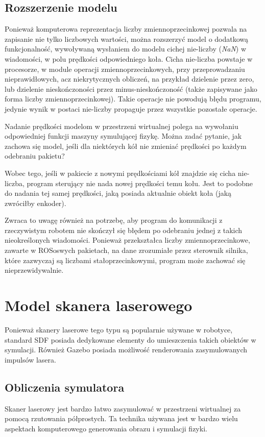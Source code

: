 	\subsection{Rozszerzenie modelu}
		\label{sec:model_nan}
		Ponieważ komputerowa reprezentacja liczby zmiennoprzecinkowej pozwala na zapisanie nie tylko liczbowych wartości, można rozszerzyć model o dodatkową funkcjonalność,
		wywoływaną wysłaniem do modelu cichej nie-liczby (\emph{NaN}) w wiadomości, w polu prędkości odpowiedniego koła. 
		Cicha nie-liczba powstaje w procesorze, w module operacji zmiennoprzecinkowych, przy przeprowadzaniu nieprawidłowych, 
		acz niekrytycznych obliczeń, na przykład dzielenie przez zero, lub dzielenie nieskończoności przez minus-nieskończoność 
		(także zapisywane jako forma liczby zmiennoprzecinkowej).
		Takie operacje nie powodują błędu programu, jedynie wynik w postaci nie-liczby propaguje przez wszystkie pozostałe operacje.

		Nadanie prędkości modelom w przestrzeni wirtualnej polega na wywołaniu odpowiedniej funkcji maszyny symulującej fizykę.
		Można zadać pytanie, jak zachowa się model, jeśli dla niektórych kół nie zmieniać prędkości po każdym odebraniu pakietu?

		Wobec tego, jeśli w pakiecie z nowymi prędkościami kół znajdzie się cicha nie-liczba, program sterujący nie nada nowej prędkości temu kołu.
		Jest to podobne do nadania tej samej prędkości, jaką posiada aktualnie obiekt koła (jaką zwróciłby enkoder).

		Zwraca to uwagę również na potrzebę, aby program do komunikacji z rzeczywistym robotem nie skończył się błędem po odebraniu jednej z takich nieokreślonych wiadomości.
		Ponieważ przekształca liczby zmiennoprzecinkowe, zawarte w ROSoswych pakietach, na dane zrozumiałe przez sterownik silnika, które zazwyczaj są liczbami
		stałoprzecinkowymi, program może zachować się nieprzewidywalnie.
		
\section{Model skanera laserowego}
	Ponieważ skanery laserowe tego typu są popularnie używane w robotyce, standard SDF posiada dedykowane elementy do umieszczenia takich obiektów w symulacji.
	Również Gazebo posiada możliwość renderowania zasymulowanych impulsów lasera.
	
	\subsection{Obliczenia symulatora}
		Skaner laserowy jest bardzo łatwo zasymulować w przestrzeni wirtualnej za pomocą rzutowania półprostych.
		Ta technika używana jest w bardzo wielu aspektach komputerowego generowania obrazu i symulacji fizyki.

